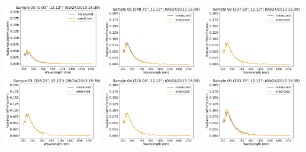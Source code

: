 \begin{center}
\includegraphics[width=0.325\textwidth]{img/09241539_s00.pdf}
\includegraphics[width=0.325\textwidth]{img/09241539_s01.pdf}
\includegraphics[width=0.325\textwidth]{img/09241539_s02.pdf}\\
\includegraphics[width=0.325\textwidth]{img/09241539_s03.pdf}
\includegraphics[width=0.325\textwidth]{img/09241539_s04.pdf}
\includegraphics[width=0.325\textwidth]{img/09241539_s05.pdf}\\

\end{center}
